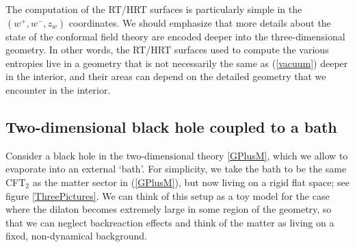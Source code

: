 \documentclass[12pt]{article}
\def\nref#1{(\ref{#1})}
\begin{document}
The computation of the RT/HRT surfaces is particularly simple in the $(w^+,w^-,z_w)$ coordinates.
We should emphasize that more details about the state of the conformal field theory are encoded deeper into the three-dimensional geometry.
In other words, the RT/HRT surfaces used to compute the various entropies live in a geometry that is not necessarily the same as \nref{vacuum} deeper in the interior, and their areas can depend on the detailed geometry that we  encounter in the interior.

\subsection{Two-dimensional black hole coupled to a bath}

Consider a black hole in the two-dimensional theory \eqref{GPlusM}, which we allow to evaporate into an external `bath'.
For simplicity, we take the bath to be the same CFT$_2$ as the matter sector in (\ref{GPlusM}), but now living on a rigid flat space; see figure \ref{ThreePictures}.
We can think of this setup as a toy model for the case where the dilaton becomes extremely large in some region of the geometry, so that we can neglect backreaction effects and think of the matter as living on a fixed, non-dynamical background. 
\end{document}
